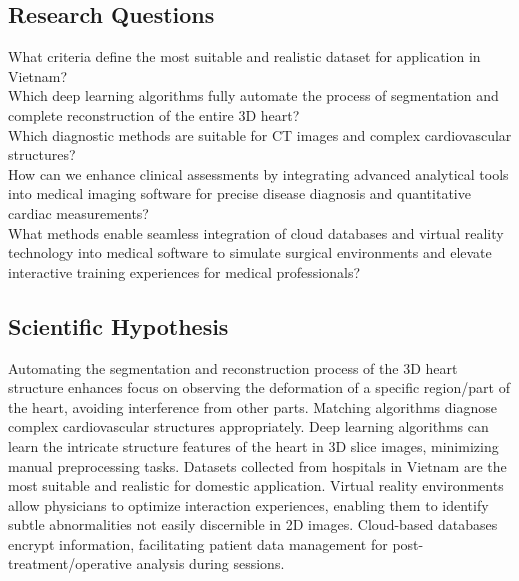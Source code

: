 \documentclass{article}
\begin{document}
\begin{multicols}{2}
\subsection{Research Questions}
What criteria define the most suitable and realistic dataset for application in Vietnam? \\
Which deep learning algorithms fully automate the process of segmentation and complete reconstruction of the entire 3D heart? \\
Which diagnostic methods are suitable for CT images and complex cardiovascular structures? \\
How can we enhance clinical assessments by integrating advanced analytical tools into medical imaging software for precise disease diagnosis and quantitative cardiac measurements? \\
What methods enable seamless integration of cloud databases and virtual reality technology into medical software to simulate surgical environments and elevate interactive training experiences for medical professionals? \\

\subsection{Scientific Hypothesis} 
Automating the segmentation and reconstruction process of the 3D heart structure enhances focus on observing the deformation of a specific region/part of the heart, avoiding interference from other parts. Matching algorithms diagnose complex cardiovascular structures appropriately. Deep learning algorithms can learn the intricate structure features of the heart in 3D slice images, minimizing manual preprocessing tasks. Datasets collected from hospitals in Vietnam are the most suitable and realistic for domestic application. Virtual reality environments allow physicians to optimize interaction experiences, enabling them to identify subtle abnormalities not easily discernible in 2D images. Cloud-based databases encrypt information, facilitating patient data management for post-treatment/operative analysis during sessions.


\end{multicols}
\end{document}

